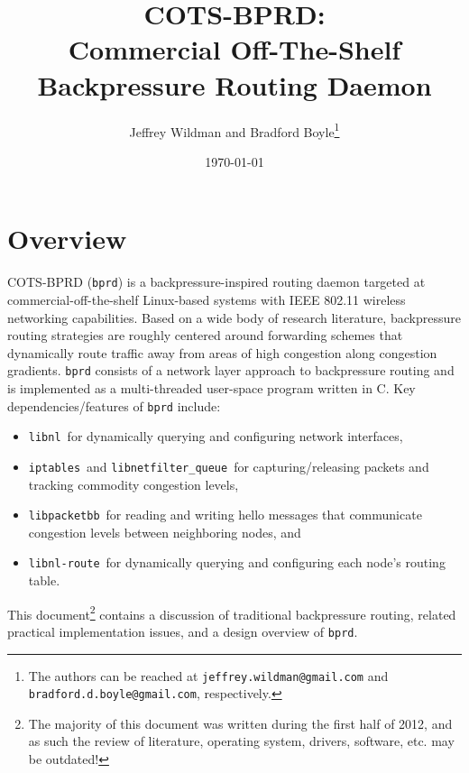 \documentclass{article}
\newenvironment{myitemize}{
	\begin{itemize}
	\setlength{\itemsep}{1pt}
	\setlength{\parskip}{0pt}
	\setlength{\parsep}{0pt}}{\end{itemize}
	}
\newcommand{\bprd}{\texttt{bprd}\xspace}
\newcommand{\iptables}{\texttt{iptables}}
\newcommand{\libnetfilterqueue}{\texttt{libnetfilter\_queue}}
\newcommand{\libnlroute}{\texttt{libnl-route}}
\newcommand{\libnl}{\texttt{libnl}}
\newcommand{\libpacketbb}{\texttt{libpacketbb}}
\begin{document}
\thispagestyle{empty}

\title{COTS-BPRD:\\Commercial Off-The-Shelf Backpressure Routing Daemon}
\date{\today}
\author{Jeffrey Wildman and Bradford Boyle\thanks{The authors can be reached at \texttt{jeffrey.wildman@gmail.com} and \texttt{bradford.d.boyle@gmail.com}, respectively.}}

\maketitle


\section*{Overview}\label{sec:overview}

COTS-BPRD (\bprd) is a backpressure-inspired routing daemon targeted at commercial-off-the-shelf Linux-based systems with IEEE 802.11 wireless networking capabilities.
Based on a wide body of research literature, backpressure routing strategies are roughly centered around forwarding schemes that dynamically route traffic away from areas of high congestion along congestion gradients.
\bprd consists of a network layer approach to backpressure routing and is implemented as a multi-threaded user-space program written in C.
Key dependencies/features of \bprd include:
\begin{myitemize}
  \item \libnl\ for dynamically querying and configuring network interfaces,
  \item \iptables\ and \libnetfilterqueue\ for capturing/releasing packets and tracking commodity congestion levels,
  \item \libpacketbb\ for reading and writing hello messages that communicate congestion levels between neighboring nodes, and
  \item \libnlroute\ for dynamically querying and configuring each node's routing table.
\end{myitemize}


This document\footnote{The majority of this document was written during the first half of 2012, and as such the review of literature, operating system, drivers, software, etc. may be outdated!} contains a discussion of traditional backpressure routing, related practical implementation issues, and a design overview of \bprd.

\newpage
\end{document}
